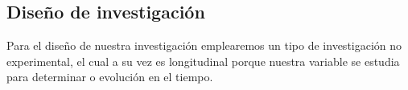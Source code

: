\subsection{Diseño de investigación}

Para el diseño de nuestra investigación emplearemos un tipo de investigación no experimental, el cual a su vez es longitudinal porque nuestra variable se estudia para determinar o evolución en el tiempo.
